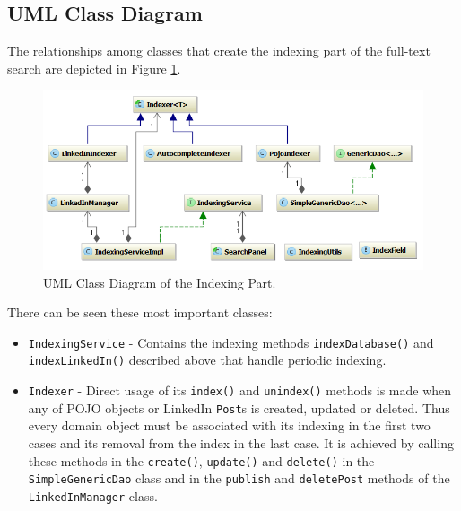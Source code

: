 %

	
\subsection{UML Class Diagram}

The relationships among classes that create the indexing part of the full-text search are depicted in Figure \ref{fig:umlDiagramIndexing}.

\begin{figure}[h]
	\centering
		\includegraphics[width=1.00\textwidth]{figures/diagram_indexing.png}
	\caption{UML Class Diagram of the Indexing Part.}
	\label{fig:umlDiagramIndexing}
\end{figure}

There can be seen these most important classes:

\begin{itemize}
	\item \texttt{IndexingService} - Contains the indexing methods \texttt{indexDatabase()} and \texttt{indexLinkedIn()} described above that handle periodic indexing.
	\item \texttt{Indexer} - Direct usage of its \texttt{index()} and \texttt{unindex()} methods is made when any of POJO objects or LinkedIn \texttt{Post}s is created, updated or deleted. Thus every domain object must be associated with its indexing in the first two cases and its removal from the index in the last case. It is achieved by calling these methods in the \texttt{create()}, \texttt{update()} and \texttt{delete()} in the \texttt{Simple\-Gene\-ric\-Dao} class and in the \texttt{publish} and \texttt{deletePost} methods of the \texttt{Linked\-In\-Ma\-na\-ger} class.
\end{itemize}

